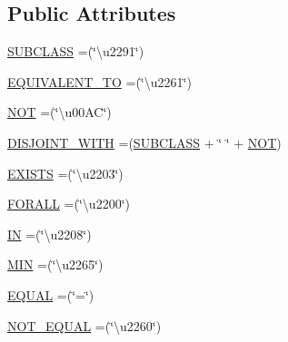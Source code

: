 \subsection*{Public Attributes}
\begin{DoxyCompactItemize}
\item 
\hyperlink{enumuk_1_1ac_1_1manchester_1_1cs_1_1owlapi_1_1dlsyntax_1_1_d_l_syntax_ac102d0316c0ba84ae8e595b25db2e52b}{S\-U\-B\-C\-L\-A\-S\-S} =(\char`\"{}\textbackslash{}u2291\char`\"{})
\item 
\hyperlink{enumuk_1_1ac_1_1manchester_1_1cs_1_1owlapi_1_1dlsyntax_1_1_d_l_syntax_a449b2d8f3c4c38221f90ad6b199ab9ce}{E\-Q\-U\-I\-V\-A\-L\-E\-N\-T\-\_\-\-T\-O} =(\char`\"{}\textbackslash{}u2261\char`\"{})
\item 
\hyperlink{enumuk_1_1ac_1_1manchester_1_1cs_1_1owlapi_1_1dlsyntax_1_1_d_l_syntax_afed0e4911c57d70c08d3c12b792a2f2f}{N\-O\-T} =(\char`\"{}\textbackslash{}u00\-A\-C\char`\"{})
\item 
\hyperlink{enumuk_1_1ac_1_1manchester_1_1cs_1_1owlapi_1_1dlsyntax_1_1_d_l_syntax_aa1797a37880fc62dd1a36a11d260580b}{D\-I\-S\-J\-O\-I\-N\-T\-\_\-\-W\-I\-T\-H} =(\hyperlink{enumuk_1_1ac_1_1manchester_1_1cs_1_1owlapi_1_1dlsyntax_1_1_d_l_syntax_ac102d0316c0ba84ae8e595b25db2e52b}{S\-U\-B\-C\-L\-A\-S\-S} + \char`\"{} \char`\"{} + \hyperlink{enumuk_1_1ac_1_1manchester_1_1cs_1_1owlapi_1_1dlsyntax_1_1_d_l_syntax_afed0e4911c57d70c08d3c12b792a2f2f}{N\-O\-T})
\item 
\hyperlink{enumuk_1_1ac_1_1manchester_1_1cs_1_1owlapi_1_1dlsyntax_1_1_d_l_syntax_acd3feed7a61e0deffe5b7ee9ca437232}{E\-X\-I\-S\-T\-S} =(\char`\"{}\textbackslash{}u2203\char`\"{})
\item 
\hyperlink{enumuk_1_1ac_1_1manchester_1_1cs_1_1owlapi_1_1dlsyntax_1_1_d_l_syntax_a4b9573710ccdccdb32d9883bf30dd160}{F\-O\-R\-A\-L\-L} =(\char`\"{}\textbackslash{}u2200\char`\"{})
\item 
\hyperlink{enumuk_1_1ac_1_1manchester_1_1cs_1_1owlapi_1_1dlsyntax_1_1_d_l_syntax_a677e57eee3aaa4e47019cd4bb450d4f0}{I\-N} =(\char`\"{}\textbackslash{}u2208\char`\"{})
\item 
\hyperlink{enumuk_1_1ac_1_1manchester_1_1cs_1_1owlapi_1_1dlsyntax_1_1_d_l_syntax_a97a26bbc8268be23413a4d29e1a0f2a7}{M\-I\-N} =(\char`\"{}\textbackslash{}u2265\char`\"{})
\item 
\hyperlink{enumuk_1_1ac_1_1manchester_1_1cs_1_1owlapi_1_1dlsyntax_1_1_d_l_syntax_a7832880fcd6c26cbee63a95b388eaaf8}{E\-Q\-U\-A\-L} =(\char`\"{}=\char`\"{})
\item 
\hyperlink{enumuk_1_1ac_1_1manchester_1_1cs_1_1owlapi_1_1dlsyntax_1_1_d_l_syntax_af8901e61e7a041611fe5dc76a3634c3a}{N\-O\-T\-\_\-\-E\-Q\-U\-A\-L} =(\char`\"{}\textbackslash{}u2260\char`\"{})

\end{DoxyCompactItemize}
